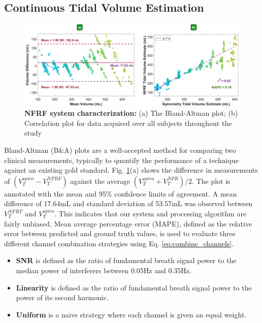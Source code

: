 \documentclass[journal]{IEEEtran}
\begin{document}
\subsection{Continuous Tidal Volume Estimation} \label{sec: tidal_vol_estimation}
\begin{figure}[t]
\centering
\includegraphics[width=.98\textwidth]{results_v3.jpg}
\caption{\textbf{NFRF system characterization:} (a) The Bland-Altman plot; (b) Correlation plot for data acquired over all subjects throughout the study}
\label{fig:results}
\end{figure}
Bland-Altman (B\&A) plots \cite{martinblandSTATISTICALMETHODSASSESSING1986}\cite{blandComparingMethodsMeasurement1995} are a well-accepted method for comparing two clinical measurements, typically to quantify the performance of a technique against an existing gold standard. Fig. \ref{fig:results}(a) shows the difference in measurements of $(V^{spiro}_T - V^{NFRF}_T)$ against the average $(V^{spiro}_T + V^{NFR}_T)/2$. The plot is annotated with the mean and 95\% confidence limits of agreement. A mean difference of 17.64mL and standard deviation of 53.57mL was observed between $V^{NFRT}_T$ and $V^{spiro}_T$. This indicates that our system and processing algorithm are fairly unbiased. Mean average percentage error (MAPE), defined as the relative error between predicted and ground truth values, is used to evaluate three different channel combination strategies using Eq. \ref{eq:combine_channels}.
\begin{itemize}
    \item \textbf{ SNR} is defined as the ratio of fundamental breath signal power to the median power of interferers between 0.05Hz and 0.35Hz. 
    \item \textbf{Linearity} is defined as the ratio of fundamental breath signal power to the power of its second harmonic. 
    \item \textbf{Uniform} is a naive strategy where each channel is given an equal weight.
\end{itemize}
\end{document}
